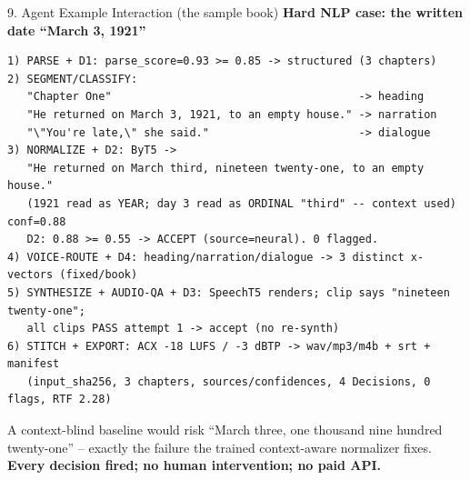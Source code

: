 \documentclass[10pt,aspectratio=169]{beamer}
\begin{document}
\begin{frame}[fragile]{9. Agent Example Interaction (the sample book)}
\textbf{Hard NLP case: the written date ``March 3, 1921''}
\begin{lstlisting}[basicstyle=\ttfamily\tiny]
1) PARSE + D1: parse_score=0.93 >= 0.85 -> structured (3 chapters)
2) SEGMENT/CLASSIFY:
   "Chapter One"                                      -> heading
   "He returned on March 3, 1921, to an empty house." -> narration
   "\"You're late,\" she said."                       -> dialogue
3) NORMALIZE + D2: ByT5 ->
   "He returned on March third, nineteen twenty-one, to an empty house."
   (1921 read as YEAR; day 3 read as ORDINAL "third" -- context used) conf=0.88
   D2: 0.88 >= 0.55 -> ACCEPT (source=neural). 0 flagged.
4) VOICE-ROUTE + D4: heading/narration/dialogue -> 3 distinct x-vectors (fixed/book)
5) SYNTHESIZE + AUDIO-QA + D3: SpeechT5 renders; clip says "nineteen twenty-one";
   all clips PASS attempt 1 -> accept (no re-synth)
6) STITCH + EXPORT: ACX -18 LUFS / -3 dBTP -> wav/mp3/m4b + srt + manifest
   (input_sha256, 3 chapters, sources/confidences, 4 Decisions, 0 flags, RTF 2.28)
\end{lstlisting}

\scriptsize A context-blind baseline would risk ``March three, one thousand nine hundred twenty-one'' -- exactly the failure the trained context-aware normalizer fixes. \textbf{Every decision fired; no human intervention; no paid API.}
\end{frame}
\end{document}
